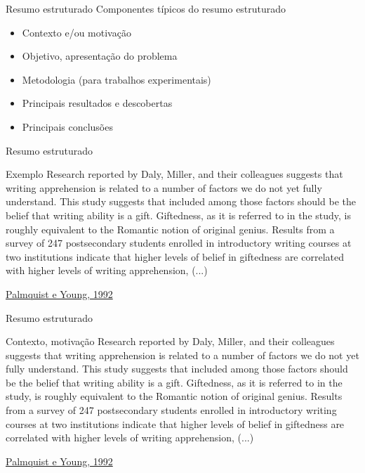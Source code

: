 \documentclass{beamer}
\begin{document}
\begin{frame}{Resumo estruturado}
  Componentes típicos do resumo estruturado
  \begin{itemize}
  \item Contexto e/ou motivação
  \item Objetivo, apresentação do problema
  \item Metodologia (para trabalhos experimentais)
  \item Principais resultados e descobertas
  \item Principais conclusões
  \end{itemize}
\end{frame}

\begin{frame}{Resumo estruturado}
  \begin{exampleblock}{Exemplo}
    \scriptsize
    Research reported by Daly, Miller, and their colleagues suggests
    that writing apprehension is related to a number of factors we do
    not yet fully understand. This study suggests that included among
    those factors should be the belief that writing ability is a
    gift. Giftedness, as it is referred to in the study, is roughly
    equivalent to the Romantic notion of original genius. Results from
    a survey of 247 postsecondary students enrolled in introductory
    writing courses at two institutions indicate that higher levels of
    belief in giftedness are correlated with higher levels of writing
    apprehension, (...) 
  \end{exampleblock}

  \vfill
  \scriptsize
  \hfill \href{https://doi.org/10.1177/0741088392009001004}{Palmquist e Young, 1992}
\end{frame}

\begin{frame}{Resumo estruturado}
  \begin{exampleblock}{Contexto, motivação}
    \scriptsize
    \alert{Research reported by Daly, Miller, and their colleagues
      suggests that writing apprehension is related to a number of
      factors we do not yet fully understand. This study suggests that
      included among those factors should be the belief that writing
      ability is a gift. Giftedness, as it is referred to in the
      study, is roughly equivalent to the Romantic notion of original
      genius.} Results from a survey of 247 postsecondary students
    enrolled in introductory writing courses at two institutions
    indicate that higher levels of belief in giftedness are correlated
    with higher levels of writing apprehension, (...)
  \end{exampleblock}

  \vfill
  \scriptsize
  \hfill \href{https://doi.org/10.1177/0741088392009001004}{Palmquist e Young, 1992}
\end{frame}
\end{document}
